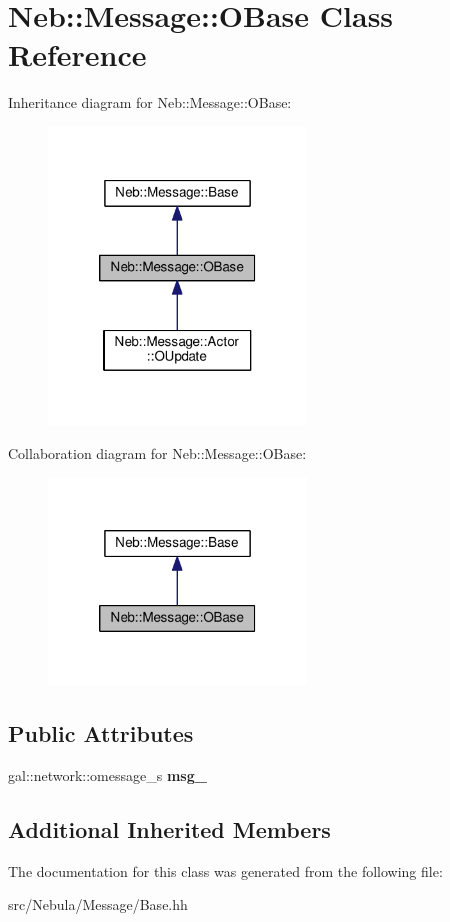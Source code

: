 \hypertarget{classNeb_1_1Message_1_1OBase}{\section{Neb\-:\-:Message\-:\-:O\-Base Class Reference}
\label{classNeb_1_1Message_1_1OBase}
}


Inheritance diagram for Neb\-:\-:Message\-:\-:O\-Base\-:
\nopagebreak
\begin{figure}[H]
\begin{center}
\leavevmode
\includegraphics[width=194pt]{classNeb_1_1Message_1_1OBase__inherit__graph}
\end{center}
\end{figure}


Collaboration diagram for Neb\-:\-:Message\-:\-:O\-Base\-:
\nopagebreak
\begin{figure}[H]
\begin{center}
\leavevmode
\includegraphics[width=194pt]{classNeb_1_1Message_1_1OBase__coll__graph}
\end{center}
\end{figure}
\subsection*{Public Attributes}
\begin{DoxyCompactItemize}
\item 
\hypertarget{classNeb_1_1Message_1_1OBase_a1c931edd23c75b30ee0c328e375dd67d}{gal\-::network\-::omessage\-\_\-s {\bfseries msg\-\_\-}}\label{classNeb_1_1Message_1_1OBase_a1c931edd23c75b30ee0c328e375dd67d}

\end{DoxyCompactItemize}
\subsection*{Additional Inherited Members}


The documentation for this class was generated from the following file\-:\begin{DoxyCompactItemize}
\item 
src/\-Nebula/\-Message/Base.\-hh\end{DoxyCompactItemize}
